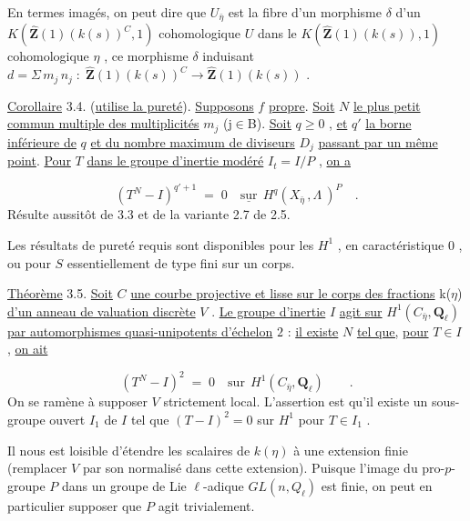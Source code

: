En termes imagés, on peut dire que  $U_{\bar{\eta}}$  est la fibre d'un morphisme  $\delta$  d'un $K(\hat{\mathbf{Z}}(1)(k(s))^{C},1)$  cohomologique  $U$  dans le  $K(\hat{\mathbf{Z}}(1)(k(s)),1)$  cohomologique  $\eta$ , ce morphisme  $\delta$  induisant  $d = \Sigma\, m_{j}\, n_{j} \;:\; \hat{\mathbf{Z}}(1)(k(s))^{C} \longrightarrow \hat{\mathbf{Z}}(1)(k(s))$ .

\underline{Corollaire} 3.4. (\underline{utilise la pureté}). \underline{Supposons} $f$ \underline{propre}. \underline{Soit} $N$ \underline{le plus petit commun multiple des multiplicités} $m_{j}$ (j$\in$B). \underline{Soit} $q \geqslant 0$ , \underline{et} $q'$ \underline{la borne inférieure de} $q$ \underline{et du nombre maximum de diviseurs} $D_{j}$ \underline{passant par un même point}. \underline{Pour} $T$ \underline{dans le groupe d'inertie modéré} $I_{t} =I/P$ , \underline{on a}

\begin{equation*}
(T^{N} - I)^{q'+1} \;=\; 0 \quad \underline{\text{sur}} \ \ H^{q}(X_{\bar{\eta}} \,,\Lambda\ )^{P} \quad .
\end{equation*}
Résulte aussitôt de 3.3 et de la variante 2.7 de 2.5.

Les résultats de pureté requis sont disponibles pour les  $H^{1}$ , en caractéristique $0$ , ou pour  $S$  essentiellement de type fini sur un corps.

\underline{Théorème} 3.5. \underline{Soit} $C$ \underline{une courbe projective et lisse sur le corps des fractions} k($\eta$) \underline{d'un anneau de valuation discrète} $V$ . \underline{Le groupe d'inertie} $I$ \underline{agit sur} $H^{1}(C_{\bar{\eta}},\mathbf{Q}_{\ell})$ \underline{par automorphismes quasi-unipotents d'échelon} $2$ : \underline{il existe} $N$ \underline{tel que,} \underline{pour} $T \in I$ , \underline{on ait}

\begin{equation*}
(T^{N} - I)^{2} \;=\; 0 \quad \text{sur} \ \ H^{1}(C_{\bar{\eta}},\mathbf{Q}_{\ell}) \qquad .
\end{equation*}
On se ramène à supposer  $V$  strictement local. L'assertion est qu'il existe un sous-groupe ouvert  $I_{1}$  de  $I$  tel que  $(T - I)^{2} = 0$  sur  $H^{1}$  pour  $T \in I_{1}$ .


Il nous est loisible d'étendre les scalaires de  $k(\eta)$  à une extension finie (remplacer  $V$  par son normalisé dans cette extension). Puisque l'image du pro-$p$-groupe  $P$  dans un groupe de  Lie $\ell$-adique  $GL(n,Q_\ell)$  est finie, on peut en particulier supposer que  $P$  agit trivialement.

